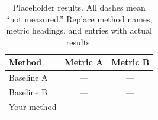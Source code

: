 \begin{table}[t]
  \centering
  \caption{Placeholder results. All dashes mean ``not measured.''
  Replace method names, metric headings, and entries with actual results.}
  \label{tab:results}
  \begin{tabular}{lcc}
    \toprule
    Method & Metric A & Metric B \\
    \midrule
    Baseline A & --- & --- \\
    Baseline B & --- & --- \\
    Your method & --- & --- \\
    \bottomrule
  \end{tabular}
\end{table}
